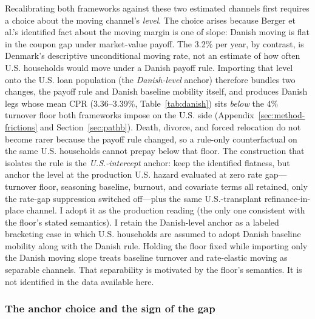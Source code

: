 \documentclass[12pt]{article}
\begin{document}
Recalibrating both frameworks against these two estimated channels first requires a choice about the moving channel's \emph{level}. The choice arises because Berger et al.'s identified fact about the moving margin is one of slope: Danish moving is flat in the coupon gap under market-value payoff. The 3.2\% per year, by contrast, is Denmark's descriptive unconditional moving rate, not an estimate of how often U.S. households would move under a Danish payoff rule. Importing that level onto the U.S. loan population (the \emph{Danish-level} anchor) therefore bundles two changes, the payoff rule and Danish baseline mobility itself, and produces Danish legs whose mean CPR (3.36--3.39\%, Table~\ref{tab:danish}) sits \emph{below} the 4\% turnover floor both frameworks impose on the U.S. side (Appendix~\ref{sec:method-frictions} and Section~\ref{sec:pathb}). Death, divorce, and forced relocation do not become rarer because the payoff rule changed, so a rule-only counterfactual on the same U.S. households cannot prepay below that floor. The construction that isolates the rule is the \emph{U.S.-intercept} anchor: keep the identified flatness, but anchor the level at the production U.S. hazard evaluated at zero rate gap---turnover floor, seasoning baseline, burnout, and covariate terms all retained, only the rate-gap suppression switched off---plus the same U.S.-transplant refinance-in-place channel. I adopt it as the production reading (the only one consistent with the floor's stated semantics). I retain the Danish-level anchor as a labeled bracketing case in which U.S. households are assumed to adopt Danish baseline mobility along with the Danish rule. Holding the floor fixed while importing only the Danish moving slope treats baseline turnover and rate-elastic moving as separable channels. That separability is motivated by the floor's semantics. It is not identified in the data available here.

\subsubsection{The anchor choice and the sign of the gap}
\end{document}
